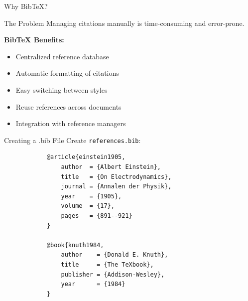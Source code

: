 \documentclass[aspectratio=169]{beamer}
\begin{document}
	\begin{frame}{Why BibTeX?}
		\begin{block}{The Problem}
			Managing citations manually is time-consuming and error-prone.
		\end{block}
		
		\vspace{1em}
		
		\textbf{BibTeX Benefits:}
		\begin{itemize}
			\item Centralized reference database
			\item Automatic formatting of citations
			\item Easy switching between styles
			\item Reuse references across documents
			\item Integration with reference managers
		\end{itemize}
	\end{frame}
	
	\begin{frame}[fragile]{Creating a .bib File}
		Create \texttt{references.bib}:
		
		\begin{lstlisting}
			@article{einstein1905,
				author  = {Albert Einstein},
				title   = {On Electrodynamics},
				journal = {Annalen der Physik},
				year    = {1905},
				volume  = {17},
				pages   = {891--921}
			}
			
			@book{knuth1984,
				author    = {Donald E. Knuth},
				title     = {The TeXbook},
				publisher = {Addison-Wesley},
				year      = {1984}
			}
		\end{lstlisting}
	\end{frame}
	
\end{document}

